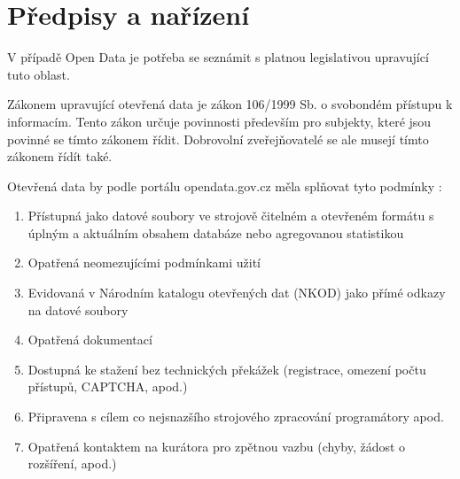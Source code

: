 \chapter{Předpisy a nařízení}
V případě Open Data je potřeba se seznámit s platnou legislativou upravující tuto oblast.

Zákonem upravující otevřená data je zákon 106/1999 Sb. o svobondém přístupu k informacím.  Tento zákon určuje povinnosti především pro subjekty, které jsou povinné se tímto zákonem řídit. Dobrovolní zveřejňovatelé se ale musejí tímto zákonem řídít také.

Otevřená data by podle portálu opendata.gov.cz měla splňovat tyto podmínky \parencite{CoJsouOtevrena2022}:
\begin{enumerate}[]
	\item{Přístupná jako datové soubory ve strojově čitelném a otevřeném formátu s úplným a aktuálním obsahem databáze nebo agregovanou statistikou} 
	\item{Opatřená neomezujícími podmínkami užití}
	\item{Evidovaná v Národním katalogu otevřených dat (NKOD) jako přímé odkazy na datové soubory}
	\item{Opatřená dokumentací}
	\item{Dostupná ke stažení bez technických překážek (registrace, omezení počtu přístupů, CAPTCHA, apod.)}
	\item{Připravena s cílem co nejsnazšího strojového zpracování programátory apod.}
	\item{Opatřená kontaktem na kurátora pro zpětnou vazbu (chyby, žádost o rozšíření, apod.)}
\end{enumerate}

